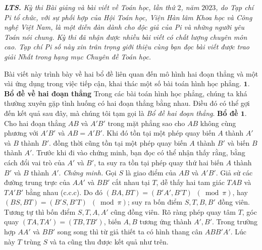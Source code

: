	\textit{\textbf{\color{diendantoanhoc}LTS.} Kỳ thi Bài giảng và bài viết về Toán học, lần thứ $2$, năm $2023$, do Tạp chí Pi tổ chức, với sự phối hợp của Hội Toán học, Viện Hàn lâm Khoa học và Công nghệ Việt Nam, là một diễn đàn dành cho độc giả của Pi và những người yêu Toán nói chung. Kỳ thi đã nhận được nhiều bài viết có chất lượng chuyên môn cao. Tạp chí Pi số này xin trân trọng giới thiệu cùng bạn đọc bài viết được trao giải Nhất trong hạng mục Chuyên đề Toán học.}
\begin{multicols}{2}
	Bài viết này trình bày về hai bổ đề liên quan đến mô hình hai đoạn thẳng và một vài ứng dụng trong việc tiếp cận, khai thác một số bài toán hình học phẳng.
	\vskip 0.1cm
	\textbf{\color{diendantoanhoc}$\pmb{1.}$ Bổ đề về hai đoạn thẳng} 
	\vskip 0.1cm
	Trong các bài toán hình học phẳng, chúng ta khá thường xuyên gặp tình huống có hai đoạn thẳng bằng nhau. Điều đó có thể gợi đến kết quả sau đây, mà chúng tôi tạm gọi là \textit{Bổ đề hai đoạn thẳng}.
	\vskip 0.1cm 
	\textbf{\color{diendantoanhoc}Bổ đề $\pmb{1.}$} Cho hai đoạn thẳng $AB$ và $A'B'$ trong mặt phẳng sao cho $AB$ không cùng phương với $A'B'$ và $AB=A'B'$. Khi đó tồn tại một phép quay biến $A$ thành $A'$ và $B$ thành $B'$. đồng thời cũng tồn tại một phép quay biến $A$ thành $B'$ và biến $B$ thành $A'$.
	\vskip 0.1cm
	Trước khi đi vào chứng minh, bạn đọc có thể nhận thấy rằng, bằng cách đổi vai trò của $A'$ và $B'$, ta suy ra tồn tại phép quay thứ hai biến $A$ thành $B'$ và  $B$ thành $A'$.
	\vskip 0.1cm
	\textit{Chứng minh.} Gọi $S$ là giao điểm của $AB$ và $A'B'$. Giả sử các đường trung trực của $AA'$ và $BB'$ cắt nhau tại $T$, dễ thấy hai tam giác $TAB$ và $TA'B'$ bằng nhau (c.c.c). Do đó $(BA,BT)=(B'A',B'T)\,\,\,(\bmod \pi)$, hay $(BS,BT)=(B'S,B'T)\,\,\,(\bmod \pi)$; suy ra bốn điểm $S,T,B,B'$ đồng viên. Tương tự thì bốn điểm $S,T,A,A'$ cũng đồng viên. Rõ ràng phép quay tâm $T$, góc quay $(TA,TA')=(TB,TB')$, biến  $A,B$ tương ứng thành $A',B'$. Trong trường hợp $AA'$ và $BB'$ song song thì từ giả thiết ta có hình thang cân $ABB'A'$. Lúc này $T$ trùng $S$ và ta cũng thu được kết quả như trên.
	\begin{figure}[H]
		\vspace*{-5pt}
		\centering
		\captionsetup{labelformat= empty, justification=centering}

\end{figure}
\end{multicols}
